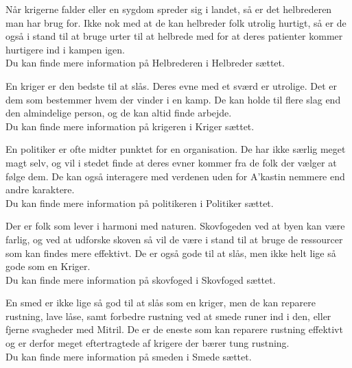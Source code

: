 \begin{prof*}[Helbreder]
Når krigerne falder eller en sygdom spreder sig i landet, så er det helbrederen man har brug for. Ikke nok med at de kan helbreder folk utrolig hurtigt, så er de også i stand til at bruge urter til at helbrede med for at deres patienter kommer hurtigere ind i kampen igen.\\
Du kan finde mere information på Helbrederen i Helbreder sættet.
\end{prof*}

\begin{prof*}[Kriger]
En kriger er den bedste til at slås. Deres evne med et sværd er utrolige. Det er dem som bestemmer hvem der vinder i en kamp. De kan holde til flere slag end den almindelige person, og de kan altid finde arbejde.\\
Du kan finde mere information på krigeren i Kriger sættet.
\end{prof*}

\begin{prof*}[Politiker]
En politiker er ofte midter punktet for en organisation. De har ikke særlig meget magt selv, og vil i stedet finde at deres evner kommer fra de folk der vælger at følge dem. De kan også interagere med verdenen uden for A'kastin nemmere end andre karaktere.\\
Du kan finde mere information på politikeren i Politiker sættet.
\end{prof*}

\begin{prof*}[Skovfoged]
Der er folk som lever i harmoni med naturen. Skovfogeden ved at byen kan være farlig, og ved at udforske skoven så vil de være i stand til at bruge de ressourcer som kan findes mere effektivt. De er også gode til at slås, men ikke helt lige så gode som en Kriger.\\
Du kan finde mere information på skovfoged i Skovfoged sættet.
\end{prof*}

\begin{prof*}[Smed]
En smed er ikke lige så god til at slås som en kriger, men de kan reparere rustning, lave låse, samt forbedre rustning ved at smede runer ind i den, eller fjerne svagheder med Mitril. De er de eneste som kan reparere rustning effektivt og er derfor meget eftertragtede af krigere der bærer tung rustning.\\
Du kan finde mere information på smeden i Smede sættet.
\end{prof*}

